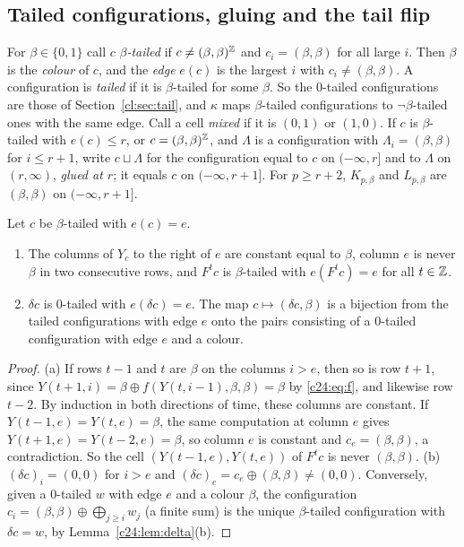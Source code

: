 \subsection{Tailed configurations, gluing and the tail flip}\label{c24:sec:tail}

For $\beta\in\{0,1\}$ call $c$ \emph{$\beta$-tailed} if $c\ne(\beta,\beta)^{\mathbb{Z}}$ and $c_i=(\beta,\beta)$ for all large $i$. Then $\beta$ is the \emph{colour} of $c$, and the \emph{edge} $e(c)$ is the largest $i$ with $c_i\ne(\beta,\beta)$. A configuration is \emph{tailed} if it is $\beta$-tailed for some $\beta$. So the $0$-tailed configurations are those of Section~\ref{cl:sec:tail}, and $\kappa$ maps $\beta$-tailed configurations to $\neg\beta$-tailed ones with the same edge. Call a cell \emph{mixed} if it is $(0,1)$ or $(1,0)$. If $c$ is $\beta$-tailed with $e(c)\le r$, or $c=(\beta,\beta)^{\mathbb{Z}}$, and $\Lambda$ is a configuration with $\Lambda_i=(\beta,\beta)$ for $i\le r+1$, write $c\sqcup\Lambda$ for the configuration equal to $c$ on $(-\infty,r]$ and to $\Lambda$ on $(r,\infty)$, \emph{glued at $r$}; it equals $c$ on $(-\infty,r+1]$. For $p\ge r+2$, $K_{p,\beta}$ and $L_{p,\beta}$ are $(\beta,\beta)$ on $(-\infty,r+1]$.

\begin{lemma}\label{c24:lem:tail}
Let $c$ be $\beta$-tailed with $e(c)=e$.
\begin{enumerate}
\item[(a)] The columns of $Y_c$ to the right of $e$ are constant equal to $\beta$, column $e$ is never $\beta$ in two consecutive rows, and $F^tc$ is $\beta$-tailed with $e(F^tc)=e$ for all $t\in\mathbb{Z}$.
\item[(b)] $\delta c$ is $0$-tailed with $e(\delta c)=e$. The map $c\mapsto(\delta c,\beta)$ is a bijection from the tailed configurations with edge $e$ onto the pairs consisting of a $0$-tailed configuration with edge $e$ and a colour.
\end{enumerate}
\end{lemma}

\begin{proof}
(a) If rows $t-1$ and $t$ are $\beta$ on the columns $i>e$, then so is row $t+1$, since $Y(t+1,i)=\beta\oplus f(Y(t,i-1),\beta,\beta)=\beta$ by \eqref{c24:eq:f}, and likewise row $t-2$. By induction in both directions of time, these columns are constant. If $Y(t-1,e)=Y(t,e)=\beta$, the same computation at column $e$ gives $Y(t+1,e)=Y(t-2,e)=\beta$, so column $e$ is constant and $c_e=(\beta,\beta)$, a contradiction. So the cell $(Y(t-1,e),Y(t,e))$ of $F^tc$ is never $(\beta,\beta)$. (b) $(\delta c)_i=(0,0)$ for $i>e$ and $(\delta c)_e=c_e\oplus(\beta,\beta)\ne(0,0)$. Conversely, given a $0$-tailed $w$ with edge $e$ and a colour $\beta$, the configuration $c_i=(\beta,\beta)\oplus\bigoplus_{j\ge i}w_j$ (a finite sum) is the unique $\beta$-tailed configuration with $\delta c=w$, by Lemma~\ref{c24:lem:delta}(b).
\end{proof}


